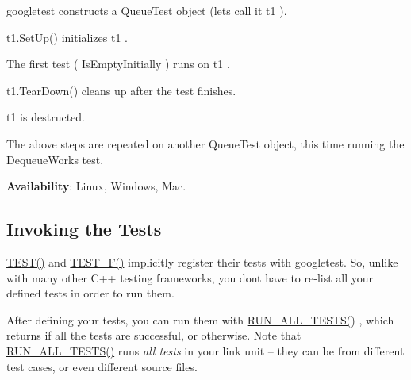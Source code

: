\begin{DoxyEnumerate}
\item googletest constructs a {\ttfamily Queue\+Test} object (let\textquotesingle{}s call it {\ttfamily t1} ).
\end{DoxyEnumerate}
\begin{DoxyEnumerate}
\item {\ttfamily t1.\+Set\+Up()} initializes {\ttfamily t1} .
\end{DoxyEnumerate}
\begin{DoxyEnumerate}
\item The first test ( {\ttfamily Is\+Empty\+Initially} ) runs on {\ttfamily t1} .
\end{DoxyEnumerate}
\begin{DoxyEnumerate}
\item {\ttfamily t1.\+Tear\+Down()} cleans up after the test finishes.
\end{DoxyEnumerate}
\begin{DoxyEnumerate}
\item {\ttfamily t1} is destructed.
\end{DoxyEnumerate}
\begin{DoxyEnumerate}
\item The above steps are repeated on another {\ttfamily Queue\+Test} object, this time running the {\ttfamily Dequeue\+Works} test.
\end{DoxyEnumerate}

{\bfseries{Availability}}\+: Linux, Windows, Mac.

\subsection*{Invoking the Tests}

{\ttfamily \mbox{\hyperlink{gtest_8h_ad8b332753515c0ab8baada563c2547eb}{T\+E\+S\+T()}}} and {\ttfamily \mbox{\hyperlink{gtest_8h_a0ee66d464d1a06c20c1929cae09d8758}{T\+E\+S\+T\+\_\+\+F()}}} implicitly register their tests with googletest. So, unlike with many other C++ testing frameworks, you don\textquotesingle{}t have to re-\/list all your defined tests in order to run them.

After defining your tests, you can run them with {\ttfamily \mbox{\hyperlink{gtest_8h_a853a3792807489591d3d4a2f2ff9359f}{R\+U\+N\+\_\+\+A\+L\+L\+\_\+\+T\+E\+S\+T\+S()}}} , which returns {} if all the tests are successful, or {} otherwise. Note that {\ttfamily \mbox{\hyperlink{gtest_8h_a853a3792807489591d3d4a2f2ff9359f}{R\+U\+N\+\_\+\+A\+L\+L\+\_\+\+T\+E\+S\+T\+S()}}} runs {\itshape all tests} in your link unit -- they can be from different test cases, or even different source files.


